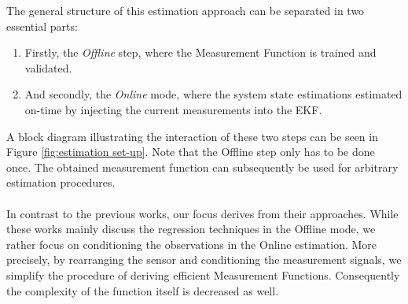 \documentclass[english]{isasthesis}
\begin{document}
     The general structure of this estimation approach can be separated in two essential parts: 
     \begin{enumerate}
     	\item Firstly, the \textit{Offline} step, where the Measurement Function is trained and validated.
     	\item And secondly, the \textit{Online} mode, where the system state estimations estimated on-time by injecting the current measurements into the EKF. 
     \end{enumerate}
     A block diagram illustrating the interaction of these two steps can be seen in Figure \ref{fig:estimation set-up}. Note that the Offline step only has to be done once. The obtained measurement function can subsequently be used for arbitrary estimation procedures.  \\ \\
In contrast to the previous works, our focus derives from their approaches. While these works mainly discuss the regression techniques in the Offline mode, we rather focus on conditioning the observations in the Online estimation. More precisely, by rearranging the sensor and conditioning the measurement signals, we simplify the procedure of deriving efficient Measurement Functions. Consequently the complexity of the function itself is decreased as well.
\end{document}
